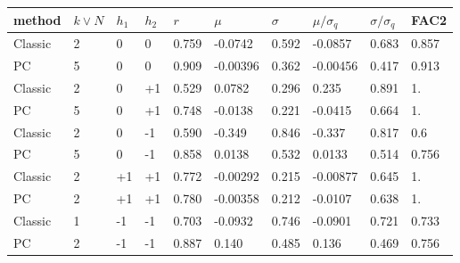 \begin{tabular}{|llll|lll|lll|}
	\hline
method & $k \lor N$ & $h_1$ & $h_2$ & $r$ & $\mu$ & $\sigma$ & $\mu/\sigma_q$ & $\sigma/\sigma_q$ & FAC2 \\\hline\hline
	Classic & 2 &  0 & 0 & 0.759 & -0.0742 & 0.592 & -0.0857 & 0.683 & 0.857 \\
	PC & 5 & 0 & 0 & 0.909 & -0.00396 & 0.362 & -0.00456 & 0.417 & 0.913 \\
	\hline
	Classic & 2 & 0 & +1 & 0.529 & 0.0782 & 0.296 & 0.235 & 0.891 & 1. \\
	PC & 5 & 0 & +1 & 0.748 & -0.0138 & 0.221 & -0.0415 & 0.664 & 1. \\
	\hline
	Classic & 2 & 0 & -1 & 0.590 & -0.349 & 0.846 & -0.337 & 0.817 & 0.6 \\
	PC & 5 &  0 & -1 & 0.858 & 0.0138 & 0.532 & 0.0133 & 0.514 & 0.756 \\
	\hline
	Classic & 2 & +1 & +1 & 0.772 & -0.00292 & 0.215 & -0.00877 & 0.645 & 1. \\
	PC & 2 & +1 & +1 & 0.780 & -0.00358 & 0.212 & -0.0107 & 0.638 & 1. \\
	\hline
	Classic & 1 & -1 & -1 & 0.703 & -0.0932 & 0.746 & -0.0901 & 0.721 & 0.733 \\
	PC & 2 & -1 & -1 & 0.887 & 0.140 & 0.485 & 0.136 & 0.469 & 0.756 \\
	\hline
\end{tabular}



